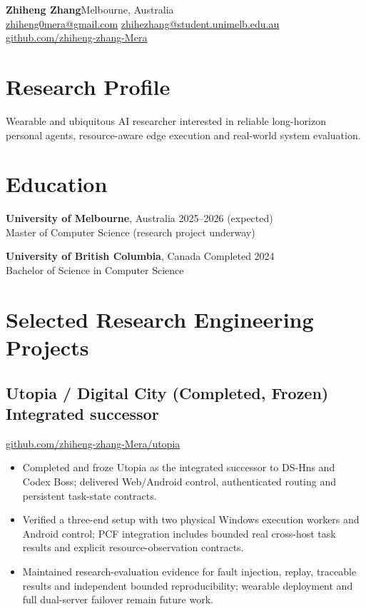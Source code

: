 \documentclass[10pt,a4paper]{article}
\begin{document}
{\LARGE\bfseries Zhiheng Zhang}\hfill Melbourne, Australia\\
\href{mailto:zhiheng0mera@gmail.com}{zhiheng0mera@gmail.com}\quad
\href{mailto:zhihezhang@student.unimelb.edu.au}{zhihezhang@student.unimelb.edu.au}\\
\href{https://github.com/zhiheng-zhang-Mera}{github.com/zhiheng-zhang-Mera}

\section{Research Profile}
Wearable and ubiquitous AI researcher interested in reliable long-horizon personal agents, resource-aware edge execution and real-world system evaluation.

\section{Education}
\textbf{University of Melbourne}, Australia \hfill 2025--2026 (expected)\\
Master of Computer Science (research project underway)

\textbf{University of British Columbia}, Canada \hfill Completed 2024\\
Bachelor of Science in Computer Science

\section{Selected Research Engineering Projects}
\subsection*{Utopia / Digital City (Completed, Frozen) \hfill \small Integrated successor}
\href{https://github.com/zhiheng-zhang-Mera/utopia}{github.com/zhiheng-zhang-Mera/utopia}
\begin{itemize}
\item Completed and froze Utopia as the integrated successor to DS-Hns and Codex Boss; delivered Web/Android control, authenticated routing and persistent task-state contracts.
\item Verified a three-end setup with two physical Windows execution workers and Android control; PCF integration includes bounded real cross-host task results and explicit resource-observation contracts.
\item Maintained research-evaluation evidence for fault injection, replay, traceable results and independent bounded reproducibility; wearable deployment and full dual-server failover remain future work.
\end{itemize}
\end{document}
